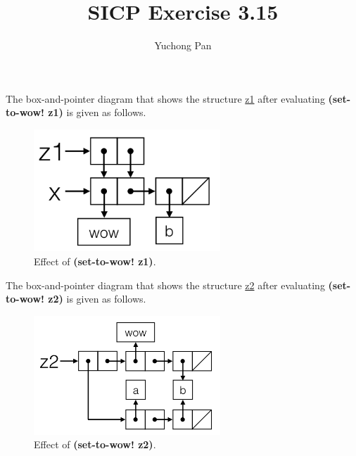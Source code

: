 \documentclass[11pt, oneside]{article}
\title{SICP Exercise 3.15}
\author{Yuchong Pan}
\begin{document}
\maketitle

The box-and-pointer diagram that shows the structure \url{z1} after evaluating \textbf{(set-to-wow! z1)} is given as follows.

\begin{figure}[h!]
    \centering\includegraphics[width=7cm]{ex-3.15-1.png}
    \caption{Effect of \textbf{(set-to-wow! z1)}.}
\end{figure}

The box-and-pointer diagram that shows the structure \url{z2} after evaluating \textbf{(set-to-wow! z2)} is given as follows.

\begin{figure}[h!]
    \centering\includegraphics[width=7cm]{ex-3.15-2.png}
    \caption{Effect of \textbf{(set-to-wow! z2)}.}
\end{figure}
\end{document}

